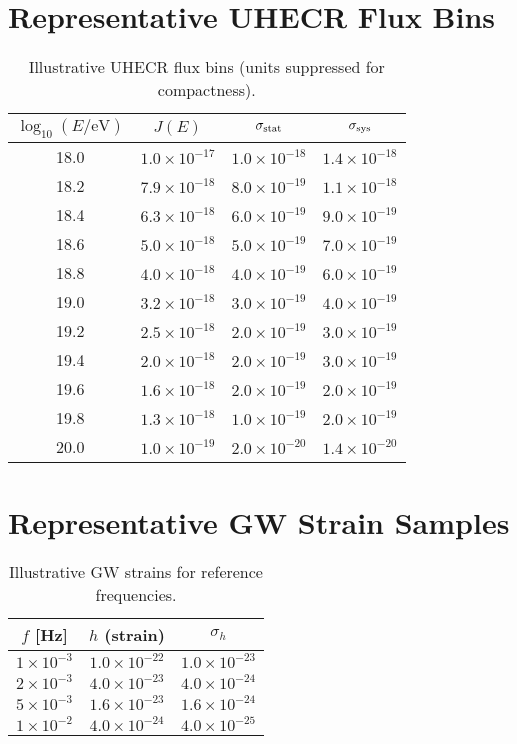 \documentclass[12pt,a4paper,oneside]{scrbook}
\theoremstyle{definition}
\theoremstyle{remark}
\begin{document}
\section{Representative UHECR Flux Bins}
\label{sec:uhecr-table}
\begin{table}[h]
\centering
\caption{Illustrative UHECR flux bins (units suppressed for compactness).}
\begin{tabular}{cccc}
\toprule
$\log_{10}(E/\mathrm{eV})$ & $J(E)$ & $\sigma_{\rm stat}$ & $\sigma_{\rm sys}$\\
\midrule
18.0 & $1.0\times 10^{-17}$ & $1.0\times 10^{-18}$ & $1.4\times 10^{-18}$\\
18.2 & $7.9\times 10^{-18}$ & $8.0\times 10^{-19}$ & $1.1\times 10^{-18}$\\
18.4 & $6.3\times 10^{-18}$ & $6.0\times 10^{-19}$ & $9.0\times 10^{-19}$\\
18.6 & $5.0\times 10^{-18}$ & $5.0\times 10^{-19}$ & $7.0\times 10^{-19}$\\
18.8 & $4.0\times 10^{-18}$ & $4.0\times 10^{-19}$ & $6.0\times 10^{-19}$\\
19.0 & $3.2\times 10^{-18}$ & $3.0\times 10^{-19}$ & $4.0\times 10^{-19}$\\
19.2 & $2.5\times 10^{-18}$ & $2.0\times 10^{-19}$ & $3.0\times 10^{-19}$\\
19.4 & $2.0\times 10^{-18}$ & $2.0\times 10^{-19}$ & $3.0\times 10^{-19}$\\
19.6 & $1.6\times 10^{-18}$ & $2.0\times 10^{-19}$ & $2.0\times 10^{-19}$\\
19.8 & $1.3\times 10^{-18}$ & $1.0\times 10^{-19}$ & $2.0\times 10^{-19}$\\
20.0 & $1.0\times 10^{-19}$ & $2.0\times 10^{-20}$ & $1.4\times 10^{-20}$\\
\bottomrule
\end{tabular}
\end{table}
\section{Representative GW Strain Samples}
\label{sec:gw-table}
\begin{table}[h]
\centering
\caption{Illustrative GW strains for reference frequencies.}
\begin{tabular}{ccc}
\toprule
$f$ [Hz] & $h$ (strain) & $\sigma_h$ \\
\midrule
$1\times 10^{-3}$ & $1.0\times 10^{-22}$ & $1.0\times 10^{-23}$\\
$2\times 10^{-3}$ & $4.0\times 10^{-23}$ & $4.0\times 10^{-24}$\\
$5\times 10^{-3}$ & $1.6\times 10^{-23}$ & $1.6\times 10^{-24}$\\
$1\times 10^{-2}$ & $4.0\times 10^{-24}$ & $4.0\times 10^{-25}$\\
\bottomrule
\end{tabular}
\end{table}
\end{document}
